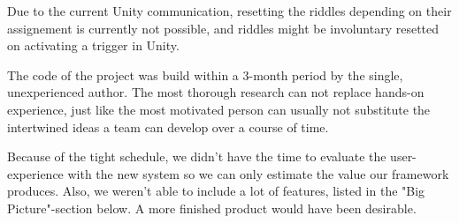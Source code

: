 Due to the current Unity communication, resetting the riddles depending on their assignement
is currently not possible, and riddles might be involuntary resetted on activating a trigger in Unity.

The code of the project was build within a 3-month period by the single, unexperienced author.
The most thorough research can not replace hands-on experience, 
just like the most motivated person can usually not substitute the intertwined ideas a team can develop over a course of time.

Because of the tight schedule, we didn't have the time to evaluate the user-experience with the new system so we can only estimate the value our framework produces.
Also, we weren't able to include a lot of features, listed in the "Big Picture"-section below.
A more finished product would have been desirable.

